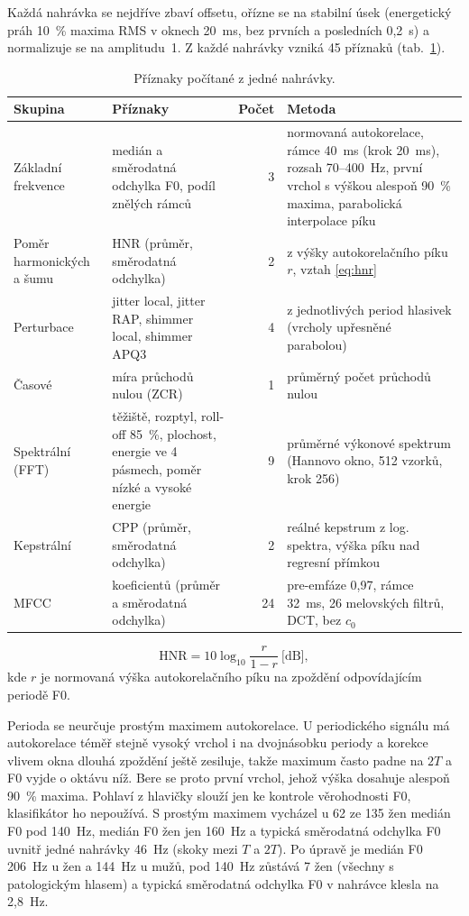 \documentclass[11pt,a4paper]{article}
\begin{document}
Každá nahrávka se nejdříve zbaví offsetu, ořízne se na stabilní úsek (energetický práh 10~\%
maxima RMS v oknech 20~ms, bez prvních a posledních 0,2~s) a normalizuje se na amplitudu~1.
Z každé nahrávky vzniká 45 příznaků (tab.~\ref{tab:priznaky}).

\begin{table}[H]
\centering\small
\caption{Příznaky počítané z jedné nahrávky.}
\label{tab:priznaky}
\begin{tabularx}{\textwidth}{>{\raggedright\arraybackslash}p{2.7cm}>{\raggedright\arraybackslash}X r >{\raggedright\arraybackslash}p{5.3cm}}
\toprule
Skupina & Příznaky & Počet & Metoda\\
\midrule
Základní frekvence & medián a směrodatná odchylka F0, podíl znělých rámců & 3 &
  normovaná autokorelace, rámce 40~ms (krok 20~ms), rozsah 70--400~Hz, první vrchol s výškou
  alespoň 90~\% maxima, parabolická interpolace píku\\
Poměr harmonických a šumu & HNR (průměr, směrodatná odchylka) & 2 &
  z výšky autokorelačního píku $r$, vztah \eqref{eq:hnr} \cite{boersma}\\
Perturbace & jitter local, jitter RAP, shimmer local, shimmer APQ3 & 4 &
  z jednotlivých period hlasivek (vrcholy upřesněné parabolou)\\
Časové & míra průchodů nulou (ZCR) & 1 & průměrný počet průchodů nulou\\
Spektrální (FFT) & těžiště, rozptyl, roll-off 85~\%, plochost, energie ve 4 pásmech, poměr nízké a vysoké energie & 9 &
  průměrné výkonové spektrum (Hannovo okno, 512 vzorků, krok 256)\\
Kepstrální & CPP (průměr, směrodatná odchylka) & 2 &
  reálné kepstrum z log. spektra, výška píku nad regresní přímkou \cite{hillenbrand}\\
MFCC & 12 koeficientů (průměr a směrodatná odchylka) & 24 &
  pre-emfáze 0,97, rámce 32~ms, 26 melovských filtrů, DCT, bez $c_0$ \cite{davis}\\
\bottomrule
\end{tabularx}
\end{table}

\begin{equation}
  \mathrm{HNR} = 10\log_{10}\frac{r}{1-r}\ \text{[dB]},
  \label{eq:hnr}
\end{equation}
kde $r$ je normovaná výška autokorelačního píku na zpoždění odpovídajícím periodě F0.

Perioda se neurčuje prostým maximem autokorelace. U periodického signálu má autokorelace téměř
stejně vysoký vrchol i na dvojnásobku periody a korekce vlivem okna \cite{boersma} dlouhá zpoždění
ještě zesiluje, takže maximum často padne na $2T$ a F0 vyjde o oktávu níž. Bere se proto první
vrchol, jehož výška dosahuje alespoň 90~\% maxima. Pohlaví z hlavičky slouží jen ke kontrole
věrohodnosti F0, klasifikátor ho nepoužívá. S prostým maximem vycházel u 62 ze 135 žen medián F0
pod 140~Hz, medián F0 žen jen 160~Hz a typická směrodatná odchylka F0 uvnitř jedné nahrávky 46~Hz
(skoky mezi $T$ a $2T$). Po úpravě je medián F0 206~Hz u žen a 144~Hz u mužů, pod 140~Hz zůstává
7 žen (všechny s patologickým hlasem) a typická směrodatná odchylka F0 v nahrávce klesla na 2,8~Hz.
\end{document}

